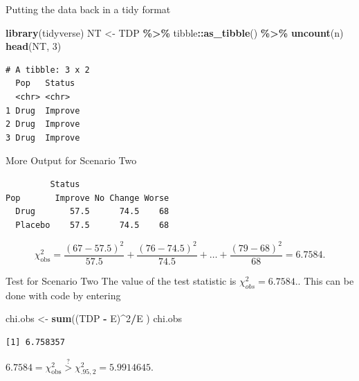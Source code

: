 \documentclass[
  ignorenonframetext,
]{beamer}
\newenvironment{Shaded}{\begin{snugshade}}{\end{snugshade}}
\newcommand{\DecValTok}[1]{\textcolor[rgb]{0.00,0.00,0.81}{#1}}
\newcommand{\FunctionTok}[1]{\textcolor[rgb]{0.13,0.29,0.53}{\textbf{#1}}}
\newcommand{\NormalTok}[1]{#1}
\newcommand{\OtherTok}[1]{\textcolor[rgb]{0.56,0.35,0.01}{#1}}
\newcommand{\SpecialCharTok}[1]{\textcolor[rgb]{0.81,0.36,0.00}{\textbf{#1}}}
\begin{document}
\begin{frame}[fragile]{Putting the data back in a tidy format}
\protect\hypertarget{putting-the-data-back-in-a-tidy-format}{}
\begin{Shaded}
\begin{Highlighting}[]
\FunctionTok{library}\NormalTok{(tidyverse)}
\NormalTok{NT }\OtherTok{\textless{}{-}}\NormalTok{ TDP }\SpecialCharTok{\%\textgreater{}\%} 
\NormalTok{  tibble}\SpecialCharTok{::}\FunctionTok{as\_tibble}\NormalTok{() }\SpecialCharTok{\%\textgreater{}\%} 
  \FunctionTok{uncount}\NormalTok{(n)}
\FunctionTok{head}\NormalTok{(NT, }\DecValTok{3}\NormalTok{)}
\end{Highlighting}
\end{Shaded}

\begin{verbatim}
# A tibble: 3 x 2
  Pop   Status 
  <chr> <chr>  
1 Drug  Improve
2 Drug  Improve
3 Drug  Improve
\end{verbatim}
\end{frame}

\begin{frame}[fragile]{More Output for Scenario Two}
\protect\hypertarget{more-output-for-scenario-two}{}
\begin{Shaded}
\end{Shaded}

\begin{verbatim}
         Status
Pop       Improve No Change Worse
  Drug       57.5      74.5    68
  Placebo    57.5      74.5    68
\end{verbatim}

\[\chi^2_{\text{obs}}=\frac{(67 - 57.5)^2}{57.5} + \frac{(76 - 74.5)^2}{74.5}+
\dots +\frac{(79-68)^2}{68}=6.7584.\]
\end{frame}

\begin{frame}[fragile]{Test for Scenario Two}
\protect\hypertarget{test-for-scenario-two-3}{}
The value of the test statistic is \(\chi^2_{obs}=6.7584.\). This can be
done with code by entering

\begin{Shaded}
\begin{Highlighting}[]
\NormalTok{chi.obs }\OtherTok{\textless{}{-}} \FunctionTok{sum}\NormalTok{((TDP }\SpecialCharTok{{-}}\NormalTok{ E)}\SpecialCharTok{\^{}}\DecValTok{2}\SpecialCharTok{/}\NormalTok{E )}
\NormalTok{chi.obs}
\end{Highlighting}
\end{Shaded}

\begin{verbatim}
[1] 6.758357
\end{verbatim}

\(6.7584 = \chi^2_{\text{obs}}\overset{?}{>} \chi^2_{.95,2}= 5.9914645.\)
\end{frame}
\end{document}
